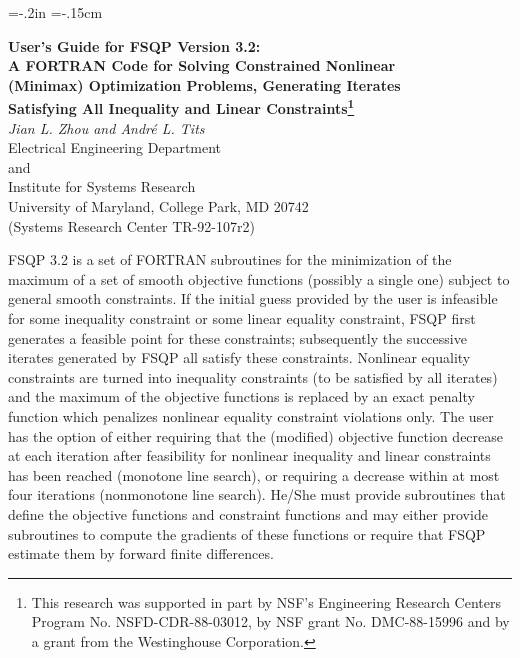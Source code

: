 
\pagestyle{myheadings}
\renewcommand{\baselinestretch}{1.08} %
 \textheight=8.3in
\topmargin=-.2in
\textwidth=6.5in
\oddsidemargin=-.15cm

\thispagestyle{empty}
\begin{titlepage}
\begin{center}
{\large \bf User's Guide for FSQP Version 3.2:\\
\vspace{1mm}
    A FORTRAN Code for Solving Constrained Nonlinear \\
\vspace{1mm} 
    (Minimax) Optimization Problems, Generating Iterates \\
\vspace{1mm}
    Satisfying All Inequality and Linear Constraints\footnote{
This research was supported in part by NSF's Engineering Research Centers 
Program No. NSFD-CDR-88-03012, by NSF grant No. DMC-88-15996 and by a grant
from the Westinghouse Corporation.}}\\
\vspace{4mm}
          {\it Jian L. Zhou and Andr\'{e} L. Tits} \\
\vspace{4mm}
    Electrical Engineering Department\\
            and\\
    Institute for Systems Research\\
    University of Maryland, College Park, MD 20742\\
     (Systems Research Center TR-92-107r2)
\end{center}
\vspace{3mm}    
\vspace{1em}    

\hspace{4mm}FSQP 3.2 is a set of FORTRAN subroutines
for the minimization of the maximum of a set of smooth 
objective functions (possibly a single one) subject to 
general smooth constraints.
If the initial guess provided by the user is infeasible for
some inequality constraint or some linear equality constraint, FSQP first 
generates a feasible point for these constraints; 
subsequently the successive iterates generated by
FSQP all satisfy these constraints. Nonlinear equality constraints
are turned into inequality constraints (to be satisfied by all iterates)
and the maximum of the objective functions is replaced 
by an exact penalty function which
penalizes nonlinear equality constraint violations only. 
The user has the option of either
requiring that the (modified) objective function decrease 
at each iteration after feasibility for nonlinear inequality and
linear constraints has been reached (monotone line search), or
requiring a decrease within at most four iterations (nonmonotone line search).
He/She must provide subroutines that define the objective functions
and constraint functions and may either provide subroutines
to compute the gradients of these functions or require that FSQP
estimate them by forward finite differences.


\end{titlepage}
